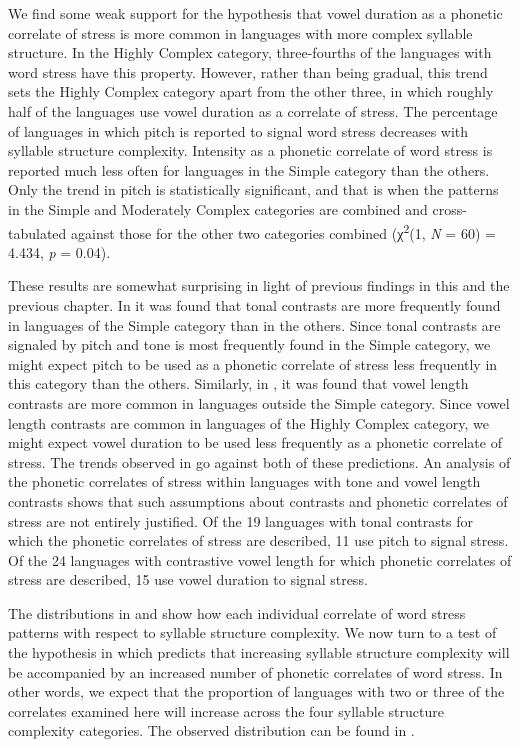   We find some weak support for the hypothesis that vowel duration as a phonetic correlate of stress is more common in languages with more complex syllable structure. In the Highly Complex category, three-fourths of the languages with word stress have this property. However, rather than being gradual, this trend sets the Highly Complex category apart from the other three, in which roughly half of the languages use vowel duration as a correlate of stress. The percentage of languages in which pitch is reported to signal word stress decreases with syllable structure complexity. Intensity as a phonetic correlate of word stress is reported much less often for languages in the Simple category than the others. Only the trend in pitch is statistically significant, and that is when the patterns in the Simple and Moderately Complex categories are combined and cross-tabulated against those for the other two categories combined (χ\textsuperscript{2}(1, \textit{N} = 60) = 4.434, \textit{p} = 0.04).

  These results are somewhat surprising in light of previous findings in this and the previous chapter. In  it was found that tonal contrasts are more frequently found in languages of the Simple category than in the others. Since tonal contrasts are signaled by pitch and tone is most frequently found in the Simple category, we might expect pitch to be used as a phonetic correlate of stress less frequently in this category than the others. Similarly, in , it was found that vowel length contrasts are more common in languages outside the Simple category. Since vowel length contrasts are common in languages of the Highly Complex category, we might expect vowel duration to be used less frequently as a phonetic correlate of stress. The trends observed in  go against both of these predictions. An analysis of the phonetic correlates of stress within languages with tone and vowel length contrasts shows that such assumptions about contrasts and phonetic correlates of stress are not entirely justified. Of the 19 languages with tonal contrasts for which the phonetic correlates of stress are described, 11 use pitch to signal stress. Of the 24 languages with contrastive vowel length for which phonetic correlates of stress are described, 15 use vowel duration to signal stress. 

  The distributions in  and  show how each individual correlate of word stress patterns with respect to syllable structure complexity. We now turn to a test of the hypothesis in  which predicts that increasing syllable structure complexity will be accompanied by an increased number of phonetic correlates of word stress. In other words, we expect that the proportion of languages with two or three of the correlates examined here will increase across the four syllable structure complexity categories. The observed distribution can be found in .

